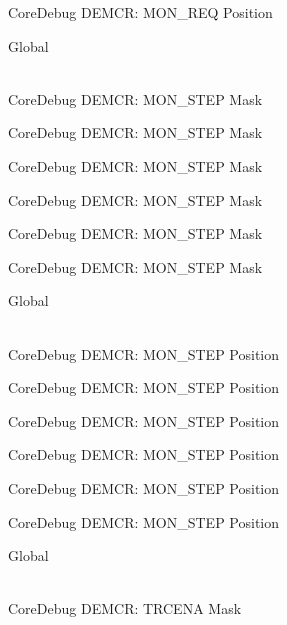\begin{DoxyRefList}
\label{deprecated__deprecated000600}%
%
Core\+Debug DEMCR\+: MON\+\_\+\+REQ Position  
\item[{\parbox[t]{\linewidth}{Global \doxylink{group___c_m_s_i_s___core_debug_ga2ded814556de96fc369de7ae9a7ceb98}{Core\+Debug\+\_\+\+DEMCR\+\_\+\+MON\+\_\+\+STEP\+\_\+\+Msk} }}]\hfill \\
\label{deprecated__deprecated000050}%
%
Core\+Debug DEMCR\+: MON\+\_\+\+STEP Mask 

\label{deprecated__deprecated000194}%
%
Core\+Debug DEMCR\+: MON\+\_\+\+STEP Mask 

\label{deprecated__deprecated000336}%
%
Core\+Debug DEMCR\+: MON\+\_\+\+STEP Mask 

\label{deprecated__deprecated000412}%
%
Core\+Debug DEMCR\+: MON\+\_\+\+STEP Mask 

\label{deprecated__deprecated000501}%
%
Core\+Debug DEMCR\+: MON\+\_\+\+STEP Mask 

\label{deprecated__deprecated000603}%
%
Core\+Debug DEMCR\+: MON\+\_\+\+STEP Mask  
\item[{\parbox[t]{\linewidth}{Global \doxylink{group___c_m_s_i_s___core_debug_ga9ae10710684e14a1a534e785ef390e1b}{Core\+Debug\+\_\+\+DEMCR\+\_\+\+MON\+\_\+\+STEP\+\_\+\+Pos} }}]\hfill \\
\label{deprecated__deprecated000049}%
%
Core\+Debug DEMCR\+: MON\+\_\+\+STEP Position 

\label{deprecated__deprecated000193}%
%
Core\+Debug DEMCR\+: MON\+\_\+\+STEP Position 

\label{deprecated__deprecated000335}%
%
Core\+Debug DEMCR\+: MON\+\_\+\+STEP Position 

\label{deprecated__deprecated000411}%
%
Core\+Debug DEMCR\+: MON\+\_\+\+STEP Position 

\label{deprecated__deprecated000500}%
%
Core\+Debug DEMCR\+: MON\+\_\+\+STEP Position 

\label{deprecated__deprecated000602}%
%
Core\+Debug DEMCR\+: MON\+\_\+\+STEP Position  
\item[{\parbox[t]{\linewidth}{Global \doxylink{group___c_m_s_i_s___core_debug_ga5e99652c1df93b441257389f49407834}{Core\+Debug\+\_\+\+DEMCR\+\_\+\+TRCENA\+\_\+\+Msk} }}]\hfill \\
\label{deprecated__deprecated000046}%
%
Core\+Debug DEMCR\+: TRCENA Mask 


\end{DoxyRefList}
